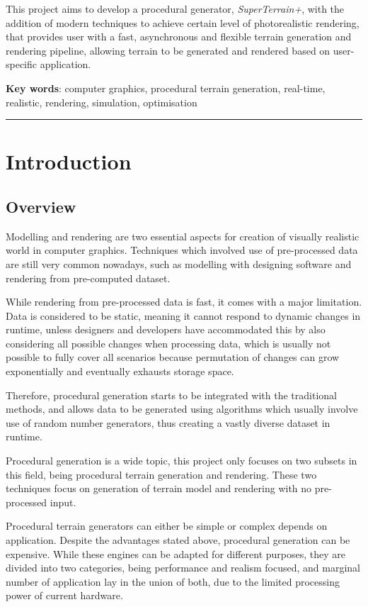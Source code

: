 \documentclass[oneside, a4paper]{report}
\begin{document}
    This project aims to develop a procedural generator, \textit{SuperTerrain+}, with the addition of modern techniques to achieve certain level of photorealistic rendering, that provides user with a fast, asynchronous and flexible terrain generation and rendering pipeline, allowing terrain to be generated and rendered based on user-specific application.

    \vspace*{1cm}
    \textbf{Key words}: computer graphics, procedural terrain generation, real-time, realistic, rendering, simulation, optimisation
    \rule{\textwidth}{1pt}
    \newpage

    \tableofcontents

    \chapter{Introduction}
    
    \section{Overview}

    Modelling and rendering are two essential aspects for creation of visually realistic world in computer graphics. Techniques which involved use of pre-processed data are still very common nowadays, such as modelling with designing software and rendering from pre-computed dataset.
    
    While rendering from pre-processed data is fast, it comes with a major limitation. Data is considered to be static, meaning it cannot respond to dynamic changes in runtime, unless designers and developers have accommodated this by also considering all possible changes when processing data, which is usually not possible to fully cover all scenarios because permutation of changes can grow exponentially and eventually exhausts storage space.

    Therefore, procedural generation starts to be integrated with the traditional methods, and allows data to be generated using algorithms which usually involve use of random number generators, thus creating a vastly diverse dataset in runtime.

    Procedural generation is a wide topic, this project only focuses on two subsets in this field, being procedural terrain generation and rendering. These two techniques focus on generation of terrain model and rendering with no pre-processed input.
    
    Procedural terrain generators can either be simple or complex depends on application. Despite the advantages stated above, procedural generation can be expensive. While these engines can be adapted for different purposes, they are divided into two categories, being performance and realism focused, and marginal number of application lay in the union of both, due to the limited processing power of current hardware.
\end{document}
